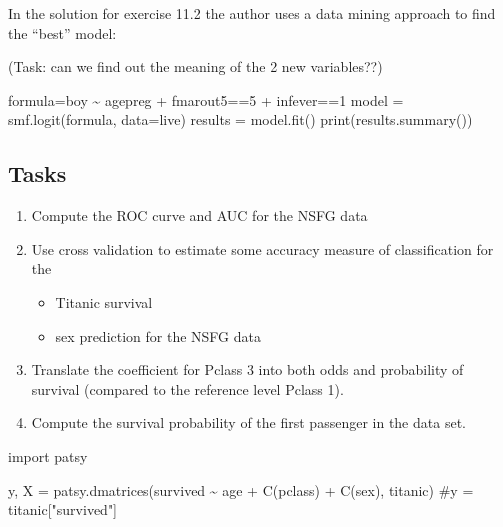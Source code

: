 \documentclass[
  letterpaper,
  DIV=11,
  numbers=noendperiod]{scrreprt}
\newenvironment{Shaded}{\begin{snugshade}}{\end{snugshade}}
\newcommand{\BuiltInTok}[1]{\textcolor[rgb]{0.00,0.23,0.31}{#1}}
\newcommand{\CommentTok}[1]{\textcolor[rgb]{0.37,0.37,0.37}{#1}}
\newcommand{\ImportTok}[1]{\textcolor[rgb]{0.00,0.46,0.62}{#1}}
\newcommand{\NormalTok}[1]{\textcolor[rgb]{0.00,0.23,0.31}{#1}}
\newcommand{\OperatorTok}[1]{\textcolor[rgb]{0.37,0.37,0.37}{#1}}
\newcommand{\StringTok}[1]{\textcolor[rgb]{0.13,0.47,0.30}{#1}}
\providecommand{\tightlist}{%
  \setlength{\itemsep}{0pt}\setlength{\parskip}{0pt}}\usepackage{longtable,booktabs,array}
\begin{document}
In the solution for exercise 11.2 the author uses a data mining approach
to find the ``best'' model:

(Task: can we find out the meaning of the 2 new variables??)

\begin{Shaded}
\begin{Highlighting}[]
\NormalTok{formula}\OperatorTok{=}\StringTok{\textquotesingle{}boy \textasciitilde{} agepreg + fmarout5==5 + infever==1\textquotesingle{}}
\NormalTok{model }\OperatorTok{=}\NormalTok{ smf.logit(formula, data}\OperatorTok{=}\NormalTok{live)}
\NormalTok{results }\OperatorTok{=}\NormalTok{ model.fit()}
\BuiltInTok{print}\NormalTok{(results.summary())}
\end{Highlighting}
\end{Shaded}

\hypertarget{tasks-5}{%
\subsection{Tasks}\label{tasks-5}}

\begin{enumerate}
\def\labelenumi{\arabic{enumi}.}
\tightlist
\item
  Compute the ROC curve and AUC for the NSFG data
\item
  Use cross validation to estimate some accuracy measure of
  classification for the

  \begin{itemize}
  \tightlist
  \item
    Titanic survival
  \item
    sex prediction for the NSFG data
  \end{itemize}
\item
  Translate the coefficient for Pclass 3 into both odds and probability
  of survival (compared to the reference level Pclass 1).
\item
  Compute the survival probability of the first passenger in the data
  set.
\end{enumerate}

\begin{Shaded}
\begin{Highlighting}[]
\ImportTok{import}\NormalTok{ patsy }

\NormalTok{y, X }\OperatorTok{=}\NormalTok{ patsy.dmatrices(}\StringTok{\textquotesingle{}survived \textasciitilde{} age + C(pclass) + C(sex)\textquotesingle{}}\NormalTok{, titanic)}
\CommentTok{\#y = titanic["survived"]}
\end{Highlighting}
\end{Shaded}
\end{document}
